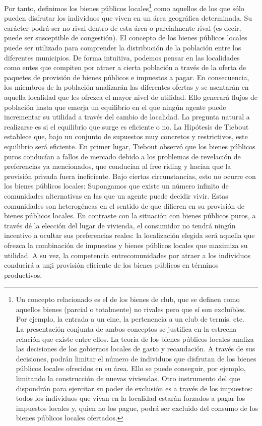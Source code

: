 \documentclass[10pt,a4paper]{article}
\begin{document}
Por tanto, definimos los bienes públicos locales\footnote{%
    Un concepto relacionado es el de los bienes de club, que se definen como aquellos bienes (parcial o totalmente) no rivales pero que sí son excluibles. Por ejemplo, la entrada a un cine, la pertenencia a un club de termis. etc.\\La presentación conjunta de ambos conceptos se justifica en la estrecha relación que existe entre ellos. La teoría de los bienes públicos locales analiza las decisiones de los gobiernos locales de gasto y recaudación. A través de sus decisiones, podrán limitar el número de individuos que disfrutan de los bienes públicos locales ofrecidos en su área. Ello se puede conseguir, por ejemplo, limitando la construcción de nuevas viviendas. Otro instrumento del que dispondrán para ejercitar su poder de exclusión es a través de los impuestos: todos los individuos que vivan en la localidad estarán forzados a pagar los impuestos locales y, quien no los pague, podrá ser excluido del consumo de los bienes públicos locales ofertados.
} como aquellos de los que sólo pueden disfrutar los individuos que viven en un área geográfica determinada. Su carácter podrá ser no rival dentro de esta área o parcialmente rival (es decir, puede ser susceptible de congestión). El concepto de los bienes públicos locales puede ser utilizado para comprender la distribución de la población entre los diferentes municipios. De forma intuitiva, podemos pensar en las localidades como entes que compiten por atraer a cierta población a través de la oferta de paquetes de provisión de bienes públicos e impuestos a pagar. En consecuencia, los miembros de la población analizarán las diferentes ofertas y se asentarán en aquella localidad que les ofrezca el mayor nivel de utilidad. Ello generará flujos de población hasta que emerja un equilibrio en el que ningún agente puede incrementar su utilidad a través del cambio de localidad. La pregunta natural a realizarse es si el equilibrio que surge es eficiente o no. La Hipótesis de Tiebout establece que, bajo un conjunto de supuestos muy concretos y restrictivos, este equilibrio será eficiente. En primer lugar, Tiebout observó que los bienes públicos puros conducían a fallos de mercado debido a los problemas de revelación de preferencias ya mencionados, que conducían al free riding y hacían que la provisión privada fuera ineficiente. Bajo ciertas circunstancias, esto no ocurre con los bienes públicos locales: Supongamos que existe un número infinito de comunidades alternativas en las que un agente puede decidir vivir. Estas comunidades son heterogéneas en el sentido de que difieren en su provisión de bienes públicos locales. En contraste con la situación con bienes públicos puros, a través dé la elección del lugar de vivienda, el consumidor no tendrá ningún incentivo a ocultar sus preferencias reales: la localización elegida será aquella que ofrezca la combinación de impuestos y bienes públicos locales que maximiza su utilidad. A su vez, la competencia entrecomunidades por atraer a los individuos conducirá a un¡i provisión eficiente de los bienes públicos
en términos productivos.
\end{document}
